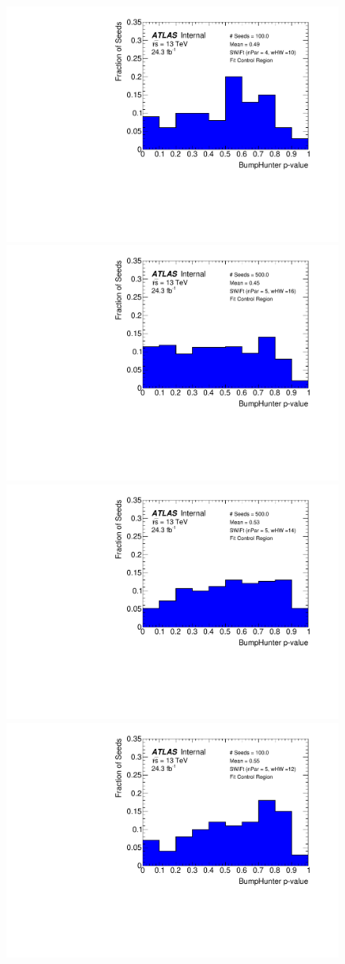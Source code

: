\begin{figure}[!htb]
 {                                                    
  \includegraphics[width=0.32\linewidth, angle=0]{figs/Dibjet/LowMass/FitStudy_min566/pVal_bumpHunter_corrFitCR_4para_low10_high10.pdf}
}\hspace{-3mm}                                       
 {                                                    
  \includegraphics[width=0.32\linewidth, angle=0]{figs/Dibjet/LowMass/FitStudy_min566/pVal_bumpHunter_corrFitCR_5para_low16_high16.pdf}
}\hspace{-3mm}                                       
 {                                                    
  \includegraphics[width=0.32\linewidth, angle=0]{figs/Dibjet/LowMass/FitStudy_min566/pVal_bumpHunter_corrFitCR_5para_low14_high14.pdf}
}\hspace{-3mm}                                       
 {                                                    
  \includegraphics[width=0.32\linewidth, angle=0]{figs/Dibjet/LowMass/FitStudy_min566/pVal_bumpHunter_corrFitCR_5para_low12_high12.pdf}
}\hspace{-3mm}                                       

\end{figure}
